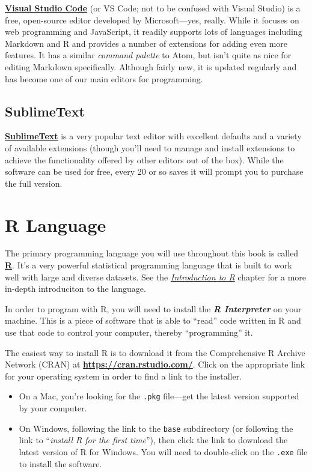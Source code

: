 \documentclass[]{book}
\providecommand{\tightlist}{%
  \setlength{\itemsep}{0pt}\setlength{\parskip}{0pt}}
\theoremstyle{definition}
\theoremstyle{definition}
\theoremstyle{remark}
\begin{document}
\href{https://code.visualstudio.com/}{\textbf{Visual Studio Code}} (or
VS Code; not to be confused with Visual Studio) is a free, open-source
editor developed by Microsoft---yes, really. While it focuses on web
programming and JavaScript, it readily supports lots of languages
including Markdown and R and provides a number of extensions for adding
even more features. It has a similar \emph{command palette} to Atom, but
isn't quite as nice for editing Markdown specifically. Although fairly
new, it is updated regularly and has become one of our main editors for
programming.

\subsection{SublimeText}\label{sublimetext}

\href{https://www.sublimetext.com/3}{\textbf{SublimeText}} is a very
popular text editor with excellent defaults and a variety of available
extensions (though you'll need to manage and install extensions to
achieve the functionality offered by other editors out of the box).
While the software can be used for free, every 20 or so saves it will
prompt you to purchase the full version.

\section{R Language}\label{r-language}

The primary programming language you will use throughout this book is
called \href{https://www.r-project.org/}{\textbf{R}}. It's a very
powerful statistical programming language that is built to work well
with large and diverse datasets. See the
\emph{\protect\hyperlink{r-intro}{Introduction to R}} chapter for a more
in-depth introduciton to the language.

In order to program with R, you will need to install the \textbf{\emph{R
Interpreter}} on your machine. This is a piece of software that is able
to ``read'' code written in R and use that code to control your
computer, thereby ``programming'' it.

The easiest way to install R is to download it from the Comprehensive R
Archive Network (CRAN) at \textbf{\url{https://cran.rstudio.com/}}.
Click on the appropriate link for your operating system in order to find
a link to the installer.

\begin{itemize}
\tightlist
\item
  On a Mac, you're looking for the \texttt{.pkg} file---get the latest
  version supported by your computer.
\item
  On Windows, following the link to the \texttt{base} subdirectory (or
  following the link to ``\emph{install R for the first time}''), then
  click the link to download the latest version of R for Windows. You
  will need to double-click on the \texttt{.exe} file to install the
  software.
\end{itemize}
\end{document}
